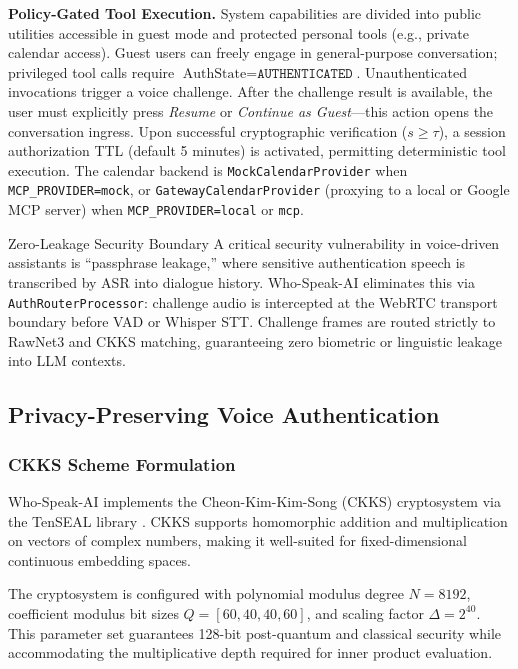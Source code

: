 \textbf{Policy-Gated Tool Execution.} System capabilities are divided into public utilities accessible in guest mode and protected personal tools (e.g., private calendar access). Guest users can freely engage in general-purpose conversation; privileged tool calls require $\text{AuthState} = \texttt{AUTHENTICATED}$. Unauthenticated invocations trigger a voice challenge. After the challenge result is available, the user must explicitly press \emph{Resume} or \emph{Continue as Guest}---this action opens the conversation ingress. Upon successful cryptographic verification ($s \ge \tau$), a session authorization TTL (default 5 minutes) is activated, permitting deterministic tool execution. The calendar backend is \texttt{MockCalendarProvider} when \texttt{MCP\_PROVIDER=mock}, or \texttt{GatewayCalendarProvider} (proxying to a local or Google MCP server) when \texttt{MCP\_PROVIDER=local} or \texttt{mcp}.

\begin{warmbox}[title=Audio Gate Isolation Boundary]{Zero-Leakage Security Boundary}
A critical security vulnerability in voice-driven assistants is ``passphrase leakage,'' where sensitive authentication speech is transcribed by ASR into dialogue history. Who-Speak-AI eliminates this via \texttt{AuthRouterProcessor}: challenge audio is intercepted at the WebRTC transport boundary before VAD or Whisper STT. Challenge frames are routed strictly to RawNet3 and CKKS matching, guaranteeing zero biometric or linguistic leakage into LLM contexts.
\end{warmbox}

\subsection{Privacy-Preserving Voice Authentication}\label{subsec:app-privacy}
\subsubsection{CKKS Scheme Formulation}
Who-Speak-AI implements the Cheon-Kim-Kim-Song (CKKS) cryptosystem \cite{cheon2017homomorphic} via the TenSEAL library \cite{tenseal2021}. CKKS supports homomorphic addition and multiplication on vectors of complex numbers, making it well-suited for fixed-dimensional continuous embedding spaces.

The cryptosystem is configured with polynomial modulus degree $N = 8192$, coefficient modulus bit sizes $Q = [60, 40, 40, 60]$, and scaling factor $\Delta = 2^{40}$. This parameter set guarantees 128-bit post-quantum and classical security while accommodating the multiplicative depth required for inner product evaluation.

